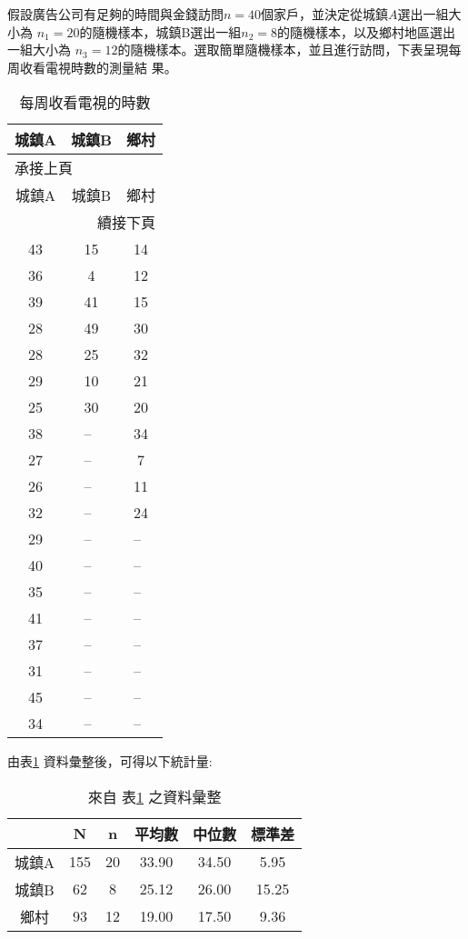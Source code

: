 		\begin{ex}\label{ex:stratified}
			假設廣告公司有足夠的時間與金錢訪問$n=40$個家戶，並決定從城鎮$A$選出一組大小為						$n_1=20$的隨機樣本，城鎮B選出一組$n_2=8$的隨機樣本，以及鄉村地區選出一組大小為					$n_3=12$的隨機樣本。選取簡單隨機樣本，並且進行訪問，下表呈現每周收看電視時數的測量結				果。			
		\begin{longtable}{@{}ccc@{}}
			\caption{每周收看電視的時數}
			\label{table_TV}\\
			\toprule
			城鎮A& 城鎮B &鄉村\\
			\midrule
			\endfirsthead
			\multicolumn{3}{l}{承接上頁}\\[2pt]
			\toprule
			城鎮A& 城鎮B &鄉村\\
			\midrule
			\endhead
			\midrule
			\multicolumn{3}{r}{續接下頁}
			\endfoot
			\endlastfoot
			35&27&8\\
			43&15&14\\
			36&4&12\\
			39&41&15\\
			28&49&30\\
			28&25&32\\
			29&10&21\\
			25&30&20\\
			38&--~&34\\
			27&--~&7\\
			26&--~&11\\
			32&--~&24\\
			29&--~&--~\\
			40&--~&--~\\
			35&--~&--~\\
			41&--~&--~\\
			37&--~&--~\\
			31&--~&--~\\
			45&--~&--~\\
			34&--~&--~\\
			\end{longtable}
		由表\ref{table_TV} 資料彙整後，可得以下統計量:
		\begin{table}[H]
		\centering
		\caption{來自 表\ref{table_TV} 之資料彙整}
			\begin{tabular}{cccccc}
			\rowcolor[gray]{.9}
			 &N&n&平均數&中位數&標準差\\ \hline
			 城鎮A&155&20&33.90&34.50&5.95\\ \hline
			 城鎮B&62&8&25.12&26.00&15.25\\ \hline
			 鄉村&93&12&19.00&17.50&9.36\\ \hline			 

\end{tabular}
\end{table}
\end{ex}
